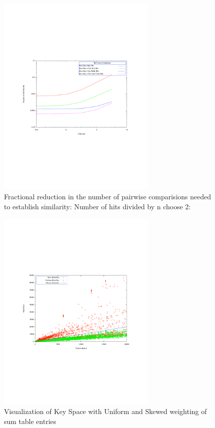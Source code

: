 \documentclass[10pt, twocolumn]{article}
\begin{document}
 \begin{figure}[h] 
 \centering
\includegraphics[width= 3in]{PairwiseElim.pdf}
\caption{Fractional reduction in the number of pairwise comparisions needed to establish similarity: Number of hits divided by n choose 2: }
\label{PairwiseSavings} 
\end{figure}    

 \begin{figure}[h] 
 \centering
\includegraphics[width= 3in]{scatter_circles.pdf}
\caption{Visualization of Key Space with Uniform and Skewed weighting of sum table entries 
}
\label{scatterPoster} 
\end{figure}   
\end{document}
